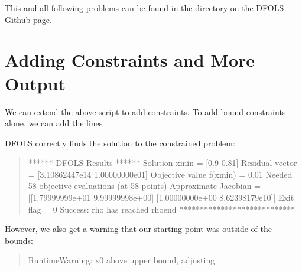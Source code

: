 \documentclass[letterpaper,10pt,english]{sphinxmanual}
\begin{document}
This and all following problems can be found in the  directory on the DFO\sphinxhyphen{}LS Github page.


\section{Adding Constraints and More Output}
\label{\detokenize{userguide:adding-constraints-and-more-output}}
We can extend the above script to add constraints. To add bound constraints alone, we can add the lines
\begin{quote}

\begin{sphinxVerbatim}[commandchars=\\\{\}]
  \PYG{p}{[} \PYG{p}{]}
  \PYG{p}{[} \PYG{p}{]}

     
\end{sphinxVerbatim}
\end{quote}

DFO\sphinxhyphen{}LS correctly finds the solution to the constrained problem:
\begin{quote}

\begin{sphinxVerbatim}[commandchars=\\\{\}]
****** DFO\PYGZhy{}LS Results ******
Solution xmin = [0.9  0.81]
Residual vector = [3.10862447e\PYGZhy{}14 1.00000000e\PYGZhy{}01]
Objective value f(xmin) = 0.01
Needed 58 objective evaluations (at 58 points)
Approximate Jacobian = [[\PYGZhy{}1.79999999e+01  9.99999998e+00]
 [\PYGZhy{}1.00000000e+00  8.62398179e\PYGZhy{}10]]
Exit flag = 0
Success: rho has reached rhoend
****************************
\end{sphinxVerbatim}
\end{quote}

However, we also get a warning that our starting point was outside of the bounds:
\begin{quote}

\begin{sphinxVerbatim}[commandchars=\\\{\}]
RuntimeWarning: x0 above upper bound, adjusting
\end{sphinxVerbatim}
\end{quote}
\end{document}
